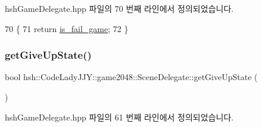 hsh\+Game\+Delegate.\+hpp 파일의 70 번째 라인에서 정의되었습니다.


\begin{DoxyCode}
70                                    \{
71                 \textcolor{keywordflow}{return} \hyperlink{classhsh_1_1_code_lady_j_j_y_1_1game2048_1_1_scene_delegate_a73d468ae6105f774847049e83ea5cc61}{is\_fail\_game};
72             \}
\end{DoxyCode}
\mbox{\label{classhsh_1_1_code_lady_j_j_y_1_1game2048_1_1_scene_delegate_abe91b73b30ea51884c07d50f4a9664f3}} 
\subsubsection{\texorpdfstring{get\+Give\+Up\+State()}{getGiveUpState()}}
{\footnotesize\ttfamily bool hsh\+::\+Code\+Lady\+J\+J\+Y\+::game2048\+::\+Scene\+Delegate\+::get\+Give\+Up\+State (\begin{DoxyParamCaption}{ }\end{DoxyParamCaption})\hspace{0.3cm}{\ttfamily [inline]}}



hsh\+Game\+Delegate.\+hpp 파일의 61 번째 라인에서 정의되었습니다.


